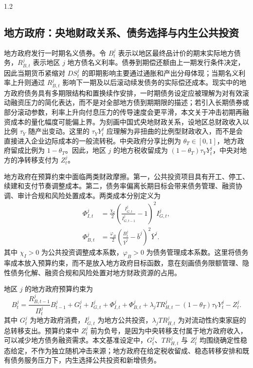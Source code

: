 \documentclass[12pt,UTF8]{ctexart}
\begin{document}
\begin{spacing}{1.2}
		
		\subsection{地方政府：央地财政关系、债务选择与内生公共投资}
		
		地方政府发行一时期名义债券。令 $B_t^j$ 表示以地区最终品计价的期末实际地方债务，$R_{B,t}^j$ 表示地区 $j$ 地方债名义利率。债券到期偿还额由上一期发行条件决定，因此当期货币紧缩对 $DS_t^j$ 的即期影响主要通过通胀和产出分母体现；当期名义利率上升则通过 $R_{B,t}^j$ 影响下一期及以后滚动续发债务的实际偿还成本。现实中的地方政府债务具有多期限结构和置换续作安排，一时期债务设定应被理解为对有效滚动融资压力的简化表达，而不是对全部地方债到期期限的描述；若引入长期债券或部分滚动参数，利率上升向付息压力的传导速度会更平滑，本文关于冲击初期再融资成本的量化幅度可能偏上界。为刻画中国式央地财政关系，设地区总财政收入以比例 $\tau_Y$ 随产出变动。这里的 $\tau_Y Y_t^j$ 应理解为非扭曲的比例型财政收入，而不是会直接进入企业边际成本的一般流转税。中央政府分享比例为 $\theta_T\in[0,1]$，地方政府留成比例为 $1-\theta_T$。因此，地区 $j$ 的地方税收留成为 $(1-\theta_T)\tau_Y Y_t^j$，中央对地方的净转移支付为 $Z_t^j$。
		
		地方政府在预算约束中面临两类财政摩擦。第一，公共投资项目具有开工、停工、续建和支付节奏调整成本。第二，债务率偏离长期目标会带来债务管理、融资协调、审计合规和风险处置成本。两类成本分别定义为
		\begin{align}
			\Phi_{I,t}^j
			&=
			\frac{\chi_I}{2}
			\left(
			\frac{I_{G,t}^j}{I_{G,t-1}^j}-1
			\right)^2 I_{G,t}^j,
			\label{eq:PhiI}\\
			\Phi_{B,t}^j
			&=
			\frac{\varphi_B}{2}
			\left(
			\frac{B_t^j}{\bar Y^j}-\bar b^j
			\right)^2\bar Y^j.
			\label{eq:PhiB}
		\end{align}
		其中 $\chi_I>0$ 为公共投资调整成本系数，$\varphi_B>0$ 为债务管理成本系数。这里将债务率成本放入预算约束，而不是放入地方政府目标函数，意在刻画债务限额管理、隐性债务化解、融资合规和风险处置对地方财政资源的占用。
		
		地区 $j$ 的地方政府预算约束为
		\begin{equation}
			B_t^j
			=
			\frac{R_{B,t-1}^j}{\Pi_t^j}B_{t-1}^j
			+G_t^j
			+I_{G,t}^j
			+\Phi_{I,t}^j
			+\Phi_{B,t}^j
			+\lambda_jTR_{H,t}^j
			-(1-\theta_T)\tau_Y Y_t^j
			-Z_t^j.
			\label{eq:gov_budget}
		\end{equation}
		其中 $G_t^j$ 为地方政府消费，$I_{G,t}^j$ 为地方公共投资，$\lambda_jTR_{H,t}^j$ 为对流动性约束家庭的总转移支出。预算约束中 $Z_t^j$ 前为负号，是因为中央转移支付属于地方政府收入，可以减少地方债务融资需求。本文基准设定中，$G_t^j$、$TR_{H,t}^j$ 与 $Z_t^j$ 均围绕确定性稳态给定，不作为独立随机冲击来源；地方政府在给定税收留成、稳态转移安排和既有债务服务压力下，内生选择公共投资和新增债务。
		

\end{spacing}
\end{document}
